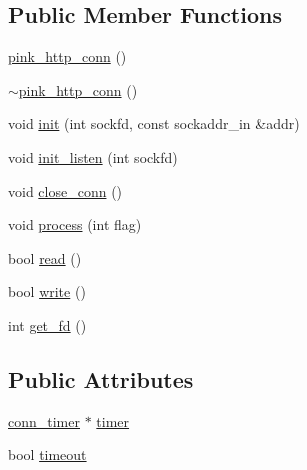 \subsection*{Public Member Functions}
\begin{DoxyCompactItemize}
\item 
\hyperlink{classpink__http__conn_afd3fc76ed1b043d5041741081a2c38ee}{pink\+\_\+http\+\_\+conn} ()
\item 
\hyperlink{classpink__http__conn_a83eb4a1a4b8afdc6bfa0959da37f0e91}{$\sim$pink\+\_\+http\+\_\+conn} ()
\item 
void \hyperlink{classpink__http__conn_abff27697496d209cdc7375f99117f018}{init} (int sockfd, const sockaddr\+\_\+in \&addr)
\item 
void \hyperlink{classpink__http__conn_a14ed30d2643f52ec95c45b11b13b2411}{init\+\_\+listen} (int sockfd)
\item 
void \hyperlink{classpink__http__conn_abdcd7c0da8072d62cb7212523f20298b}{close\+\_\+conn} ()
\item 
void \hyperlink{classpink__http__conn_a41ca12d76d0056562633f27d456d0b62}{process} (int flag)
\item 
bool \hyperlink{classpink__http__conn_a254c09e8b962e5a0bc116f8da271b5ed}{read} ()
\item 
bool \hyperlink{classpink__http__conn_a362df085394bbf2818c8af93932c80d5}{write} ()
\item 
int \hyperlink{classpink__http__conn_aa304899ec9a7f6d7a2a9d738309a9570}{get\+\_\+fd} ()
\end{DoxyCompactItemize}
\subsection*{Public Attributes}
\begin{DoxyCompactItemize}
\item 
\hyperlink{classconn__timer}{conn\+\_\+timer} $\ast$ \hyperlink{classpink__http__conn_a0b34c6a8a6b8f65fa882adb109990e43}{timer}
\item 
bool \hyperlink{classpink__http__conn_a8687eb679249e4ae085c319dd2d4dfc7}{timeout}
\end{DoxyCompactItemize}
